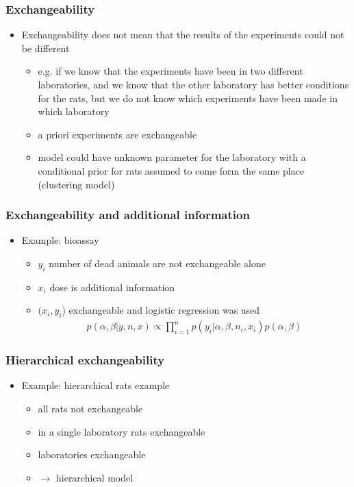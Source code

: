 \documentclass[10pt]{beamer}
\begin{document}
\begin{frame}

\frametitle{Exchangeability}

  \begin{itemize}
  \item Exchangeability does not mean that the results of the
    experiments could not be different
    \begin{itemize}
    \item e.g. if we know that the experiments have been in two
      different laboratories, and we know that the other laboratory
      has better conditions for the rats, but we do not know which
      experiments have been made in which laboratory
    \item a priori experiments are exchangeable
    \item model could have unknown parameter for the laboratory with a
      conditional prior for rats assumed to come form the same place
      (clustering model)
    \end{itemize}
  \end{itemize}
\end{frame}

\begin{frame}

\frametitle{Exchangeability and additional information}

  \begin{itemize}
  \item Example: bioassay
    \begin{itemize}
      \item<+-> $y_i$ number of dead animals are not exchangeable alone
      \item<+-> $x_i$ dose is additional information
      \item<+-> $(x_i,y_i$) exchangeable and logistic regression was used
    \begin{align*}
      p(\alpha,\beta|y,n,x)\propto \prod_{i=1}^n p(y_i|\alpha,\beta,n_i,x_i)p(\alpha,\beta)
    \end{align*}
    \end{itemize}
  \end{itemize}
\end{frame}

\begin{frame}

\frametitle{Hierarchical exchangeability}

  \begin{itemize}
  \item Example: hierarchical rats example
    \begin{itemize}
    \item<+-> all rats not exchangeable
    \item<+-> in a single laboratory rats exchangeable
    \item<+-> laboratories exchangeable
    \item<+-> $\rightarrow$ hierarchical model
    \end{itemize}
  \end{itemize}
\end{frame}
\end{document}
